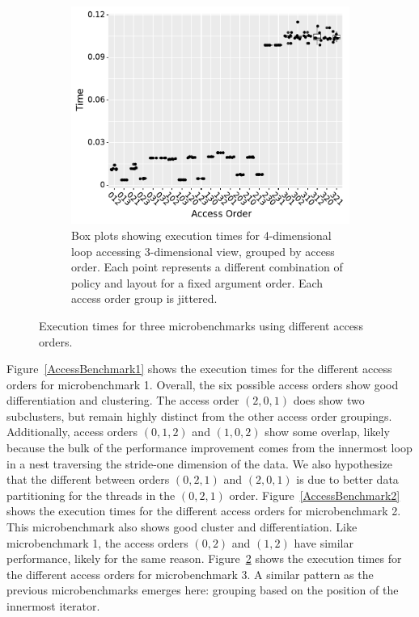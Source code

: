 \documentclass[sigconf,review=true]{acmart}
\begin{document}
\begin{figure}
\bigskip
\begin{subfigure}{0.48\textwidth}
	\includegraphics[width=\textwidth]{benchmark3_boxplot.pdf}
	\caption{Box plots showing execution times for 4-dimensional loop accessing 3-dimensional view, grouped by access order. Each point represents a different combination of policy and layout for a fixed argument order. Each access order group is jittered.}
	\label{AccessBenchmark3}
\end{subfigure}

\caption{Execution times for three microbenchmarks using different access orders.}
\end{figure}

Figure~\ref{AccessBenchmark1} shows the execution times for the different access orders for microbenchmark 1.
Overall, the six possible access orders show good differentiation and clustering.
The access order $(2,0,1)$ does show two subclusters, but remain highly distinct from the other access order groupings. 
Additionally, access orders $(0,1,2)$ and $(1,0,2)$ show some overlap, likely because the bulk of the performance improvement comes from the innermost loop in a nest traversing the stride-one dimension of the data.
We also hypothesize that the different between orders $(0,2,1)$ and $(2,0,1)$ is due to better data partitioning for the threads in the $(0,2,1)$ order. 
Figure~\ref{AccessBenchmark2} shows the execution times for the different access orders for microbenchmark 2. 
This microbenchmark also shows good cluster and differentiation.
Like microbenchmark 1, the access orders $(0,2)$ and $(1,2)$ have similar performance, likely for the same reason. 
Figure~\ref{AccessBenchmark3} shows the execution times for the different access orders for microbenchmark 3.
A similar pattern as the previous microbenchmarks emerges here: grouping based on the position of the innermost iterator. 
\end{document}
